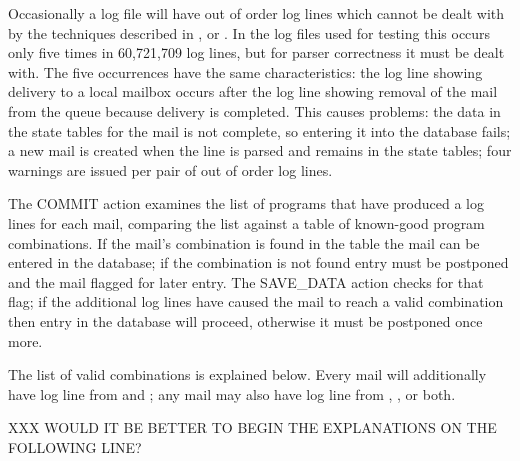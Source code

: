 Occasionally a log file will have out of order log lines which cannot be
dealt with by the techniques described in ,  or .  In the \numberOFlogFILES{} log files used for
testing this occurs only five times in 60,721,709 log lines, but for parser
correctness it must be dealt with.  The five occurrences have the same
characteristics: the  log line showing delivery to a local
mailbox occurs after the  log line showing removal of the mail
from the queue because delivery is completed.  This causes problems: the
data in the state tables for the mail is not complete, so entering it into
the database fails; a new mail is created when the  line is
parsed and remains in the state tables; four warnings are issued per pair
of out of order log lines.

The COMMIT action examines the list of programs that have produced a log
lines for each mail, comparing the list against a table of known-good
program combinations.  If the mail's combination is found in the table the
mail can be entered in the database; if the combination is not found entry
must be postponed and the mail flagged for later entry.  The SAVE\_DATA
action checks for that flag; if the additional log lines have caused the
mail to reach a valid combination then entry in the database will proceed,
otherwise it must be postponed once more.

The list of valid combinations is explained below.  Every mail will
additionally have log line from  and ; any
mail may also have log line from , , or
both.

XXX WOULD IT BE BETTER TO BEGIN THE EXPLANATIONS ON THE FOLLOWING LINE\@?

